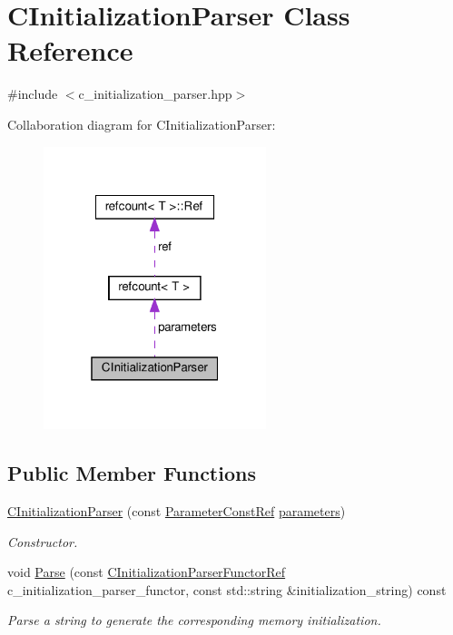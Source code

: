 \hypertarget{classCInitializationParser}{}\section{C\+Initialization\+Parser Class Reference}
\label{classCInitializationParser}


{\ttfamily \#include $<$c\+\_\+initialization\+\_\+parser.\+hpp$>$}



Collaboration diagram for C\+Initialization\+Parser\+:
\nopagebreak
\begin{figure}[H]
\begin{center}
\leavevmode
\includegraphics[width=184pt]{d9/d07/classCInitializationParser__coll__graph}
\end{center}
\end{figure}
\subsection*{Public Member Functions}
\begin{DoxyCompactItemize}
\item 
\hyperlink{classCInitializationParser_a0d406a9678838a7b052d4b16345efa65}{C\+Initialization\+Parser} (const \hyperlink{Parameter_8hpp_a37841774a6fcb479b597fdf8955eb4ea}{Parameter\+Const\+Ref} \hyperlink{classCInitializationParser_a22401e9e15572a141c0d08a6290c612b}{parameters})
\begin{DoxyCompactList}\small\item\em Constructor. \end{DoxyCompactList}\item 
void \hyperlink{classCInitializationParser_adef21cf1b94ba814a5a49ed8f25c5292}{Parse} (const \hyperlink{c__initialization__parser__functor_8hpp_a6ef48614177b399e30c2c728bd1aa4a0}{C\+Initialization\+Parser\+Functor\+Ref} c\+\_\+initialization\+\_\+parser\+\_\+functor, const std\+::string \&initialization\+\_\+string) const
\begin{DoxyCompactList}\small\item\em Parse a string to generate the corresponding memory initialization. \end{DoxyCompactList}\end{DoxyCompactItemize}

